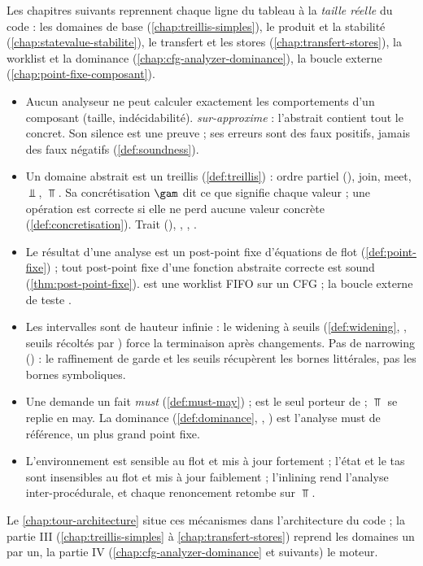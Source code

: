 Les chapitres suivants reprennent chaque ligne du tableau à la
\emph{taille réelle} du code : les domaines de base
(\cref{chap:treillis-simples}), le produit  et la stabilité
(\cref{chap:statevalue-stabilite}), le transfert et les stores
(\cref{chap:transfert-stores}), la worklist et la dominance
(\cref{chap:cfg-analyzer-dominance}), la boucle externe
(\cref{chap:point-fixe-composant}).

\begin{resume}
\begin{itemize}
  \item Aucun analyseur ne peut calculer exactement les comportements d'un
    composant (taille, indécidabilité). \reactant{} \emph{sur-approxime} :
    l'abstrait contient tout le concret. Son silence est une preuve ; ses
    erreurs sont des faux positifs, jamais des faux négatifs
    (\cref{def:soundness}).
  \item Un domaine abstrait est un treillis (\cref{def:treillis}) : ordre
    partiel (), join, meet, $\Bot$, $\Top$. Sa
    concrétisation $\gam$ dit ce que signifie chaque valeur ; une opération
    est correcte si elle ne perd aucune valeur concrète
    (\cref{def:concretisation}). Trait 
    (), , ,
    .
  \item Le résultat d'une analyse est un post-point fixe d'équations de flot
    (\cref{def:point-fixe}) ; tout post-point fixe d'une fonction abstraite
    correcte est sound (\cref{thm:post-point-fixe}).  est
    une worklist FIFO sur un CFG ; la boucle externe de
     teste .
  \item Les intervalles sont de hauteur infinie : le widening à seuils
    (\cref{def:widening}, , seuils récoltés par
    ) force la terminaison après
     changements. Pas de narrowing () : le
    raffinement de garde et les seuils récupèrent les bornes littérales, pas
    les bornes symboliques.
  \item Une \Error{} demande un fait \emph{must} (\cref{def:must-may}) ;
     est le seul porteur de  ; $\Top$ se
    replie en may. La dominance (\cref{def:dominance},
    , ) est l'analyse must
    de référence, un plus grand point fixe.
  \item L'environnement est sensible au flot et mis à jour fortement ; l'état
    et le tas sont insensibles au flot et mis à jour faiblement ; l'inlining
    rend l'analyse inter-procédurale, et chaque renoncement retombe sur
    $\Top$.
\end{itemize}
Le \cref{chap:tour-architecture} situe ces mécanismes dans l'architecture du
code ; la partie III (\cref{chap:treillis-simples} à
\cref{chap:transfert-stores}) reprend les domaines un par un, la partie IV
(\cref{chap:cfg-analyzer-dominance} et suivants) le moteur.
\end{resume}

